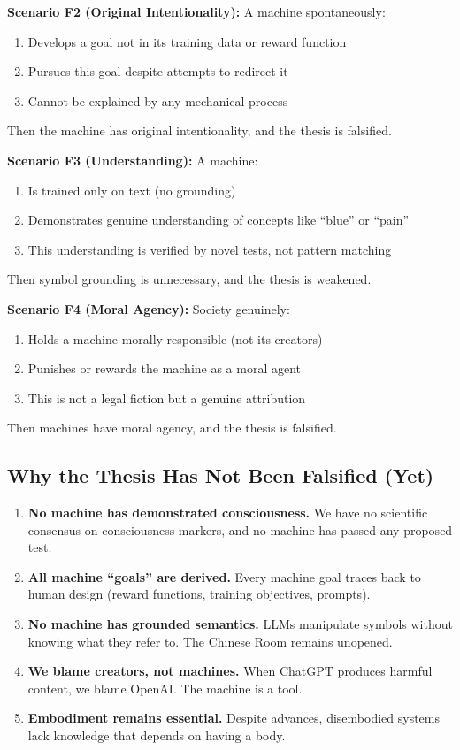 \textbf{Scenario F2 (Original Intentionality):} A machine spontaneously:
\begin{enumerate}
    \item Develops a goal not in its training data or reward function
    \item Pursues this goal despite attempts to redirect it
    \item Cannot be explained by any mechanical process
\end{enumerate}
Then the machine has original intentionality, and the thesis is falsified.

\textbf{Scenario F3 (Understanding):} A machine:
\begin{enumerate}
    \item Is trained only on text (no grounding)
    \item Demonstrates genuine understanding of concepts like ``blue'' or ``pain''
    \item This understanding is verified by novel tests, not pattern matching
\end{enumerate}
Then symbol grounding is unnecessary, and the thesis is weakened.

\textbf{Scenario F4 (Moral Agency):} Society genuinely:
\begin{enumerate}
    \item Holds a machine morally responsible (not its creators)
    \item Punishes or rewards the machine as a moral agent
    \item This is not a legal fiction but a genuine attribution
\end{enumerate}
Then machines have moral agency, and the thesis is falsified.

\subsection{Why the Thesis Has Not Been Falsified (Yet)}

\begin{enumerate}
    \item \textbf{No machine has demonstrated consciousness.} We have no scientific consensus on consciousness markers, and no machine has passed any proposed test.

    \item \textbf{All machine ``goals'' are derived.} Every machine goal traces back to human design (reward functions, training objectives, prompts).

    \item \textbf{No machine has grounded semantics.} LLMs manipulate symbols without knowing what they refer to. The Chinese Room remains unopened.

    \item \textbf{We blame creators, not machines.} When ChatGPT produces harmful content, we blame OpenAI. The machine is a tool.

    \item \textbf{Embodiment remains essential.} Despite advances, disembodied systems lack knowledge that depends on having a body.
\end{enumerate}

